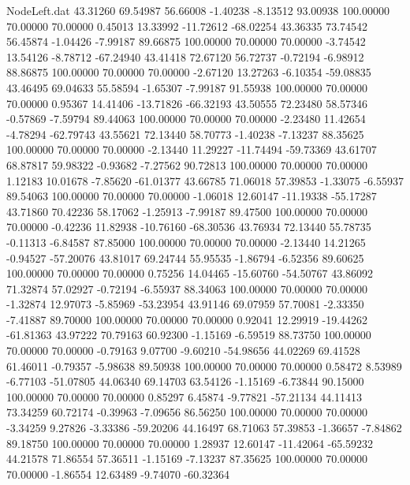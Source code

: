 \begin{filecontents}{NodeLeft.dat}
  43.31260   69.54987   56.66008    -1.40238   -8.13512   93.00938  100.00000   70.00000   70.00000    0.45013   13.33992  -11.72612  -68.02254
  43.36335   73.74542   56.45874    -1.04426   -7.99187   89.66875  100.00000   70.00000   70.00000   -3.74542   13.54126   -8.78712  -67.24940
  43.41418   72.67120   56.72737    -0.72194   -6.98912   88.86875  100.00000   70.00000   70.00000   -2.67120   13.27263   -6.10354  -59.08835
  43.46495   69.04633   55.58594    -1.65307   -7.99187   91.55938  100.00000   70.00000   70.00000    0.95367   14.41406  -13.71826  -66.32193
  43.50555   72.23480   58.57346    -0.57869   -7.59794   89.44063  100.00000   70.00000   70.00000   -2.23480   11.42654   -4.78294  -62.79743
  43.55621   72.13440   58.70773    -1.40238   -7.13237   88.35625  100.00000   70.00000   70.00000   -2.13440   11.29227  -11.74494  -59.73369
  43.61707   68.87817   59.98322    -0.93682   -7.27562   90.72813  100.00000   70.00000   70.00000    1.12183   10.01678   -7.85620  -61.01377
  43.66785   71.06018   57.39853    -1.33075   -6.55937   89.54063  100.00000   70.00000   70.00000   -1.06018   12.60147  -11.19338  -55.17287
  43.71860   70.42236   58.17062    -1.25913   -7.99187   89.47500  100.00000   70.00000   70.00000   -0.42236   11.82938  -10.76160  -68.30536
  43.76934   72.13440   55.78735    -0.11313   -6.84587   87.85000  100.00000   70.00000   70.00000   -2.13440   14.21265   -0.94527  -57.20076
  43.81017   69.24744   55.95535    -1.86794   -6.52356   89.60625  100.00000   70.00000   70.00000    0.75256   14.04465  -15.60760  -54.50767
  43.86092   71.32874   57.02927    -0.72194   -6.55937   88.34063  100.00000   70.00000   70.00000   -1.32874   12.97073   -5.85969  -53.23954
  43.91146   69.07959   57.70081    -2.33350   -7.41887   89.70000  100.00000   70.00000   70.00000    0.92041   12.29919  -19.44262  -61.81363
  43.97222   70.79163   60.92300    -1.15169   -6.59519   88.73750  100.00000   70.00000   70.00000   -0.79163    9.07700   -9.60210  -54.98656
  44.02269   69.41528   61.46011    -0.79357   -5.98638   89.50938  100.00000   70.00000   70.00000    0.58472    8.53989   -6.77103  -51.07805
  44.06340   69.14703   63.54126    -1.15169   -6.73844   90.15000  100.00000   70.00000   70.00000    0.85297    6.45874   -9.77821  -57.21134
  44.11413   73.34259   60.72174    -0.39963   -7.09656   86.56250  100.00000   70.00000   70.00000   -3.34259    9.27826   -3.33386  -59.20206
  44.16497   68.71063   57.39853    -1.36657   -7.84862   89.18750  100.00000   70.00000   70.00000    1.28937   12.60147  -11.42064  -65.59232
  44.21578   71.86554   57.36511    -1.15169   -7.13237   87.35625  100.00000   70.00000   70.00000   -1.86554   12.63489   -9.74070  -60.32364

\end{filecontents}
